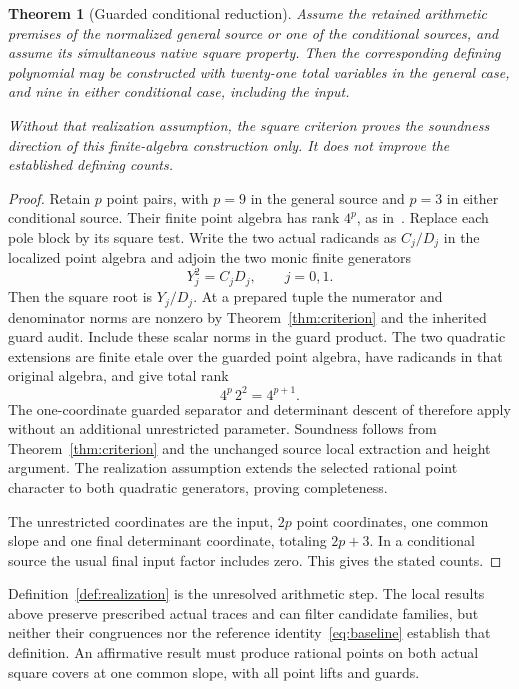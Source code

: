 \documentclass[11pt,a4paper]{article}
\newtheorem{theorem}{Theorem}[section]
\begin{document}
\begin{theorem}[Guarded conditional reduction]\label{thm:count}
Assume the retained arithmetic premises of the normalized general
source or one of the conditional sources, and assume its simultaneous
native square property. Then the corresponding defining polynomial
may be constructed with twenty-one total variables in the general
case, and nine in either conditional case, including the input.

Without that realization assumption, the square criterion proves the
soundness direction of this finite-algebra construction only. It does
not improve the established defining counts.
\end{theorem}
\begin{proof}
Retain $p$ point pairs, with $p=9$ in the general source and $p=3$
in either conditional source. Their finite point algebra has rank
$4^p$, as in~\cite{Unit}. Replace each pole block by its square test.
Write the two actual radicands as $C_j/D_j$ in the localized point
algebra and adjoin the two monic finite generators
\[
                     Y_j^2=C_jD_j,\qquad j=0,1.
\]
Then the square root is $Y_j/D_j$. At a prepared tuple the numerator
and denominator norms are nonzero by Theorem~\ref{thm:criterion}
and the inherited guard audit. Include these scalar norms in the guard
product. The two quadratic extensions are finite etale over the guarded
point algebra, have radicands in that original algebra, and give total rank
\[
                              4^p\,2^2=4^{p+1}.
\]
The one-coordinate guarded separator and determinant descent of
\cite{Unit} therefore apply without an additional unrestricted
parameter. Soundness follows from Theorem~\ref{thm:criterion} and the
unchanged source local extraction and height argument. The realization
assumption extends the selected rational point character to both
quadratic generators, proving completeness.

The unrestricted coordinates are the input, $2p$ point coordinates,
one common slope and one final determinant coordinate, totaling
$2p+3$. In a conditional source the usual final input factor includes
zero. This gives the stated counts.
\end{proof}

Definition~\ref{def:realization} is the unresolved arithmetic step.
The local results above preserve prescribed actual traces and can
filter candidate families, but neither their congruences nor the
reference identity~\eqref{eq:baseline} establish that definition.
An affirmative result must produce rational points on both actual
square covers at one common slope, with all point lifts and guards.
\end{document}
